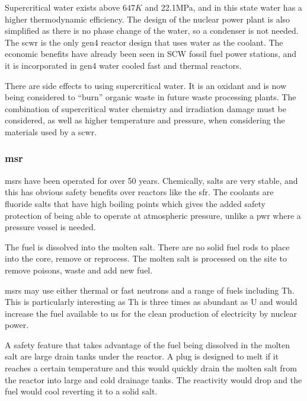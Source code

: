 Supercritical water exists above $647K$ and 22.1MPa, and in this state water has a higher thermodynamic efficiency.  The design of the nuclear power plant is also simplified as there is no phase change of the water, so a condenser is not needed.  The \acrfull{scwr} is the only \acrshort{gen4} reactor design that uses water as the coolant\cite{gen4}.  The economic benefits have already been seen in SCW fossil fuel power stations, and it is incorporated in \acrshort{gen4} water cooled fast and thermal reactors.  

There are side effects to using supercritical water.  It is an oxidant and is now being considered to \enquote{burn} organic waste in future waste processing plants.  The combination of supercritical water chemistry and irradiation damage must be considered, as well as higher temperature and pressure, when considering the materials used by a \acrshort{scwr}.




\FloatBarrier
\subsubsection{\acrlong{msr}}

\acrshort{msr}s have been operated for over 50 years.  Chemically, salts are very stable, and this has obvious safety benefits over reactors like the \acrshort{sfr}.  The coolants are fluoride salts that have high boiling points which gives the added safety protection of being able to operate at atmospheric pressure, unlike a \acrshort{pwr} where a pressure vessel is needed.

The fuel is dissolved into the molten salt.  There are no solid fuel rods to place into the core, remove or reprocess.  The molten salt is processed on the site to remove poisons, waste and add new fuel.  

\acrshort{msr}s may use either thermal or fast neutrons and a range of fuels including \Gls{Th}.  This is particularly interesting as Th is three times as abundant as U and would increase the fuel available to us for the clean production of electricity by nuclear power.

A safety feature that takes advantage of the fuel being dissolved in the molten salt are large drain tanks under the reactor.  A plug is designed to melt if it reaches a certain temperature and this would quickly drain the molten salt from the reactor into large and cold drainage tanks.  The reactivity would drop and the fuel would cool reverting it to a solid salt. 


